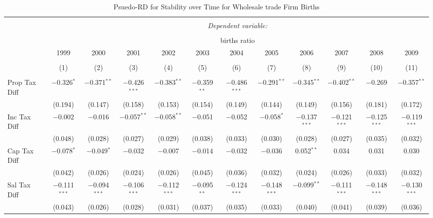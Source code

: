 
\begin{table}[!htbp] \centering 
  \caption{Psuedo-RD for Stability over Time for  Wholesale trade Firm Births} 
  \label{42year} 
\small 
\begin{tabular}{@{\extracolsep{5pt}}lccccccccccc} 
\\[-1.8ex]\hline 
\hline \\[-1.8ex] 
 & \multicolumn{11}{c}{\textit{Dependent variable:}} \\ 
\cline{2-12} 
\\[-1.8ex] & \multicolumn{11}{c}{births ratio} \\ 
 & 1999 & 2000 & 2001 & 2002 & 2003 & 2004 & 2005 & 2006 & 2007 & 2008 & 2009 \\ 
\\[-1.8ex] & (1) & (2) & (3) & (4) & (5) & (6) & (7) & (8) & (9) & (10) & (11)\\ 
\hline \\[-1.8ex] 
 Prop Tax Diff & $-$0.326$^{*}$ & $-$0.371$^{**}$ & $-$0.426$^{***}$ & $-$0.383$^{**}$ & $-$0.359$^{**}$ & $-$0.486$^{***}$ & $-$0.291$^{**}$ & $-$0.345$^{**}$ & $-$0.402$^{**}$ & $-$0.269 & $-$0.357$^{**}$ \\ 
  & (0.194) & (0.147) & (0.158) & (0.153) & (0.154) & (0.149) & (0.144) & (0.149) & (0.156) & (0.181) & (0.172) \\ 
  Inc Tax Diff & $-$0.002 & $-$0.016 & $-$0.057$^{**}$ & $-$0.058$^{**}$ & $-$0.051 & $-$0.052 & $-$0.058$^{*}$ & $-$0.137$^{***}$ & $-$0.121$^{***}$ & $-$0.125$^{***}$ & $-$0.119$^{***}$ \\ 
  & (0.048) & (0.028) & (0.027) & (0.029) & (0.038) & (0.033) & (0.030) & (0.028) & (0.027) & (0.035) & (0.032) \\ 
  Cap Tax Diff & $-$0.078$^{*}$ & $-$0.049$^{*}$ & $-$0.032 & $-$0.007 & $-$0.014 & $-$0.032 & $-$0.036 & 0.052$^{**}$ & 0.034 & 0.031 & 0.030 \\ 
  & (0.042) & (0.026) & (0.024) & (0.026) & (0.045) & (0.036) & (0.032) & (0.024) & (0.026) & (0.033) & (0.032) \\ 
  Sal Tax Diff & $-$0.111$^{***}$ & $-$0.094$^{***}$ & $-$0.106$^{***}$ & $-$0.112$^{***}$ & $-$0.095$^{**}$ & $-$0.124$^{***}$ & $-$0.148$^{***}$ & $-$0.099$^{**}$ & $-$0.111$^{***}$ & $-$0.148$^{***}$ & $-$0.130$^{***}$ \\ 
  & (0.043) & (0.026) & (0.028) & (0.031) & (0.037) & (0.035) & (0.033) & (0.040) & (0.041) & (0.039) & (0.036) \\ 

\end{tabular}
\end{table}
